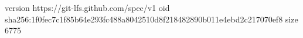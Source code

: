version https://git-lfs.github.com/spec/v1
oid sha256:1f0fec7c1f85b64e293fc488a8042510d8f218482890b011e4ebd2c217070ef8
size 6775
